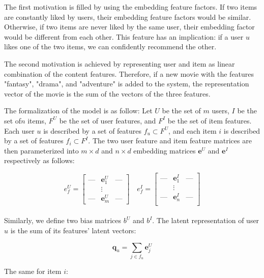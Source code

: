 \noindent The first motivation is filled by using the embedding feature factors. If two items are constantly liked by users, their embedding feature factors would be similar. Otherwise, if two items are never liked by the same user, their embedding factor would be different from each other. This feature has an implication: if a user \(u\) likes one of the two items, we can confidently recommend the other.

\noindent The second motivation is achieved by representing user and item as linear combination of the content features. Therefore, if a new movie with the features "fantasy", "drama", and "adventure" is added to the system, the representation vector of the movie is the sum of the vectors of the three features. 

\noindent The formalization of the model is as follow:
Let \(U\) be the set of \(m\) users, \(I\) be the set of\(n\)  items, \(F^U\) be the set of user features, and \(F^I\) be the set of item features. Each user \(u\) is described by a set of features \(f_u \subset F^U\), and each item \(i\) is described by a set of features \(f_i \subset F^I\). The two user feature and item feature matrices are then parameterized into \(m \times d\) and \(n \times d\) embedding matrices \(\boldsymbol{e}^U\) and \(\boldsymbol{e}^I\) respectively as follows:

\[
e_f^U = \begin{bmatrix}
\mbox{---} & \boldsymbol{e}_1^U & \mbox{---} \\
 & \vdots & \\ 
\mbox{---} & \boldsymbol{e}_m^U & \mbox{---}
\end{bmatrix} \quad
e_f^I = 
\begin{bmatrix}
\mbox{---} & \boldsymbol{e}_1^I & \mbox{---} \\
 & \vdots &  \\ 
\mbox{---}& \boldsymbol{e}_n^I& \mbox{---}\\
\end{bmatrix}
\]
\\


\noindent Similarly, we define two bias matrices \(b^U\) and \(b^I\). The latent representation of user \(u\) is the sum of its features' latent vectors:

\begin{displaymath}
\boldsymbol{q}_u = \sum_{j \in f_u} \boldsymbol{e}_j^U
\end{displaymath}

\noindent The same for item \(i\):

